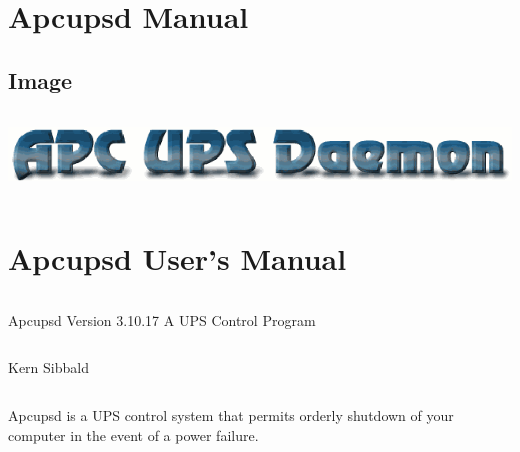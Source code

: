 
\section*{Apcupsd Manual}
\label{_ChapterStart}

\subsection*{Image}
\label{TOC0}

\footnotesize
\begin{verbatim}
\end{verbatim}
\normalsize

\includegraphics{./apcupsd.eps} 

\footnotesize
\begin{verbatim}
\end{verbatim}
\normalsize

\section*{Apcupsd User's Manual}

\footnotesize
\begin{verbatim}
\end{verbatim}
\normalsize

Apcupsd Version 3.10.17 A UPS Control Program  

\footnotesize
\begin{verbatim}
\end{verbatim}
\normalsize

Kern Sibbald 

\footnotesize
\begin{verbatim}
\end{verbatim}
\normalsize

Apcupsd is a UPS control system that permits orderly shutdown of your computer
in the event of a power failure.  

\footnotesize
\begin{verbatim}
\end{verbatim}
\normalsize

